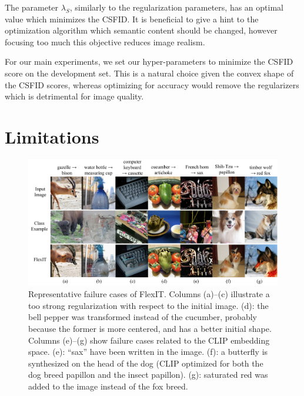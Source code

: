 The parameter $\lambda_S$, similarly to the regularization parameters, has an optimal
 value which minimizes the \ac{CSFID}. It is beneficial to give a hint to the optimization 
 algorithm which semantic content should be changed, however focusing too much this 
 objective reduces image realism.

For our main experiments, we set our hyper-parameters to  minimize the \ac{CSFID} score on 
the development set. This is a natural choice given the convex shape of the \ac{CSFID} 
scores, whereas optimizing for accuracy  would   remove the regularizers which is 
detrimental for image quality.


\section{Limitations}

\begin{figure}[h]
    \center
    \includegraphics[width=\linewidth]{images/flexit/assets/failures.pdf}
    \caption{
    Representative failure cases of FlexIT. 
    Columns (a)--(c) illustrate a too strong regularization with respect to the initial image. 
    (d): the bell pepper was transformed instead of the cucumber, probably because the former is more centered, and has a better initial shape. 
    Columns (e)--(g) show failure cases related to the \ac{CLIP} embedding space. 
    (e): ``sax'' have been written in the image. 
    (f): a butterfly is synthesized on the head of the dog (\ac{CLIP} optimized for both the dog breed papillon and the insect papillon). 
    (g): saturated red was added to the image instead of the fox breed.
    }
\label{fig:failures}
\end{figure}

